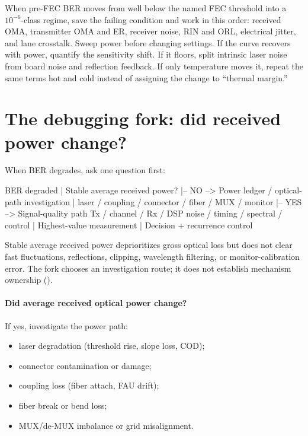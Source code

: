 When pre-FEC BER moves from well below the named FEC threshold into a
$10^{-6}$-class regime, save the failing condition and work in this order:
received OMA, transmitter OMA and ER, receiver noise, RIN and ORL, electrical
jitter, and lane crosstalk.
Sweep power before changing settings. If the curve recovers with power, quantify
the sensitivity shift. If it floors, split intrinsic laser noise from board noise
and reflection feedback. If only temperature moves it, repeat the same terms hot
and cold instead of assigning the change to ``thermal margin.''


\section{The debugging fork: did received power change?}
\label{sec:debug-fork}

When BER degrades, ask one question first:

\begin{dectree}
BER degraded
  |
Stable average received power?
  |-- NO  --> Power ledger / optical-path investigation
  |           laser / coupling / connector / fiber / MUX / monitor
  |-- YES --> Signal-quality path
              Tx / channel / Rx / DSP
              noise / timing / spectral / control
  |
Highest-value measurement
  |
Decision + recurrence control
\end{dectree}

Stable average received power deprioritizes gross optical loss but does not
clear fast fluctuations, reflections, clipping, wavelength filtering, or
monitor-calibration error. The fork chooses an investigation route; it does not
establish mechanism ownership ().

\paragraph{Did average received optical power change?}
If yes, investigate the power path:
\begin{itemize}
\item laser degradation (threshold rise, slope loss, COD);
\item connector contamination or damage;
\item coupling loss (fiber attach, FAU drift);
\item fiber break or bend loss;
\item MUX/de-MUX imbalance or grid misalignment.
\end{itemize}


